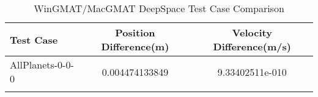 \begin{table}[htbp!]
\centering
\caption{ WinGMAT/MacGMAT DeepSpace Test Case Comparison}
      \begin{tabular}{lcc}
      \hline\hline
          Test Case & Position Difference(m) & Velocity Difference(m/s) \\
         \hline
         AllPlanets-0-0-0 & 0.004474133849 & 9.33402511e-010 \\
      \hline\hline
      \label{Table: DeepSpace WinGMAT-MacGMAT Table} 
\end{tabular}
\end{table}
